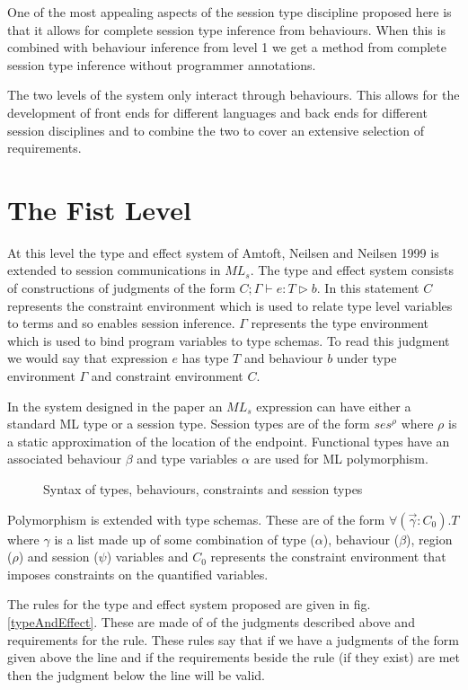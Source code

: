 One of the most appealing aspects of the session type discipline proposed here is that it allows for complete session type inference from behaviours. When this is combined with behaviour inference from level 1 we get a method from complete session type inference without programmer annotations. 

The two levels of the system only interact through behaviours. This allows for the development of front ends for different languages and back ends for different session disciplines and to combine the two to cover an extensive selection of requirements. 

\section{The Fist Level} \label{level1}

At this level the type and effect system of Amtoft, Neilsen and Neilsen 1999 \cite{amtoft} is extended to session communications in $ML_s$. The type and effect system consists of constructions of judgments of the form $C;\Gamma \vdash e : T \triangleright b$. In this statement $C$ represents the constraint environment which is used to relate type level variables to terms and so enables session inference. $\Gamma$ represents the type environment which is used to bind program variables to type schemas. To read this judgment we would say that expression $e$ has type $T$ and behaviour $b$ under type environment $\Gamma$ and constraint environment $C$.

In the system designed in the paper an $ML_s$ expression can have either a standard ML type or a session type. Session types are of the form $ses^\rho$ where $\rho$ is a static approximation of the location of the endpoint. Functional types have an associated behaviour $\beta$ and type variables $\alpha$ are used for ML polymorphism. 

\begin{figure}
\caption{Syntax of types, behaviours, constraints and session types}
\label{syntaxTypes}
\end{figure}

Polymorphism is extended with type schemas. These are of the form $\forall(\overrightarrow{\gamma}:C_0).T$ where $\gamma$ is a list made up of some combination of type ($\alpha$), behaviour ($\beta$), region ($\rho$) and session ($\psi$) variables and $C_0$ represents the constraint environment that imposes constraints on the quantified variables. 

The rules for the type and effect system proposed are given in fig. \ref{typeAndEffect}. These are made of of the judgments described above and requirements for the rule. These rules say that if we have a judgments of the form given above the line and if the requirements beside the rule (if they exist) are met then the judgment below the line will be valid.

